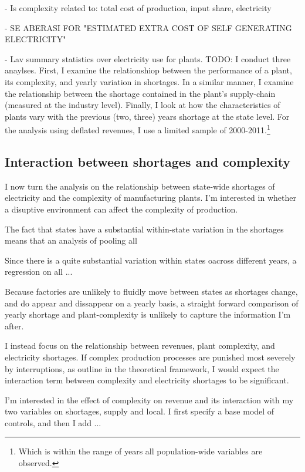 \documentclass[11pt]{article}
\begin{document}
- Is complexity related to: total cost of production, input share, electricity 

- SE ABERASI FOR "ESTIMATED EXTRA COST OF SELF GENERATING ELECTRICITY"

- Lav summary statistics over electricity use for plants.
TODO: I conduct three anaylses. First, I examine the relationshiop between the performance of a plant, its complexity, and yearly variation in shortages. In a similar manner, I examine the relationship between the shortage contained in the plant's supply-chain (measured at the industry level). Finally, I look at how the characteristics of plants vary with the previous (two, three) years shortage at the state level. For the analysis using deflated revenues, I use a limited sample of 2000-2011.\footnote{Which is within the range of years all population-wide variables are observed.} 
\subsection{Interaction between shortages and complexity}%
\label{sub:regressions}

I now turn the analysis on the relationship between state-wide shortages of electricity and the complexity of manufacturing plants. I'm interested in whether a disuptive environment can affect the complexity of production.

The fact that states have a substantial within-state variation in the shortages means that an analysis of pooling all

Since there is a quite substantial variation within states oacross different years, a regression on all ...

Because factories are unlikely to fluidly move between states as shortages change, and do appear and dissappear on a yearly basis, a straight forward comparison of yearly shortage and plant-complexity is unlikely to capture the information I'm after. 

I instead focus on the relationship between revenues, plant complexity, and electricity shortages. If complex production processes are punished most severely by interruptions, as outline in the theoretical framework, I would expect the interaction term between complexity and electricity shortages to be significant. 


I'm interested in the effect of complexity on revenue and its interaction with my two variables on shortages, supply and local. 
I first specify a base model of controls, and then I add ...
\end{document}
